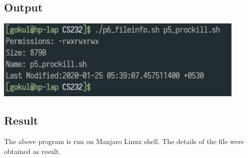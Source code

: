 \documentclass{article}
\begin{document}
\subsection{Output}
\includegraphics[width=0.9\textwidth]{img/p10.png}\newline

\subsection{Result}
The above program is run on Manjaro Linux shell. The details of the file
were obtained as result.
\end{document}
